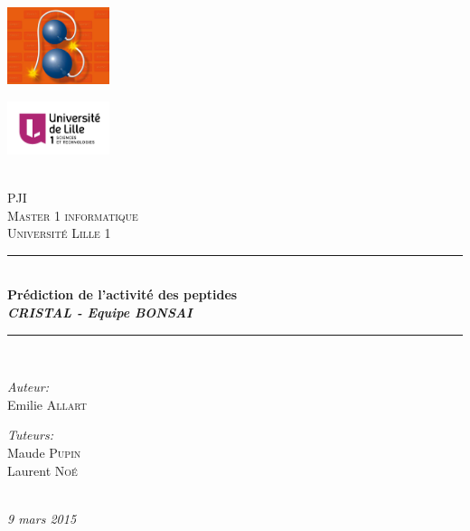 \documentclass[a4paper,10pt]{report}
\date{2014-2015}
\newcommand{\HRule}{\rule{\linewidth}{0.5mm}}
\begin{document}
\begin{titlepage}
 \begin{center}

 \begin{minipage}{0.4\textwidth}
    \begin{flushleft} \large
        \includegraphics[width=3cm]{image/bonsai.jpg}
    \end{flushleft}
  \end{minipage}
  \begin{minipage}{0.4\textwidth}
    \begin{flushright} \large
      \includegraphics[width=3cm]{image/lille1.png}
    \end{flushright}
  \end{minipage} 
  ~\\[3cm]

  \textsc{\LARGE PJI\\ Master 1 informatique}\\[1.5cm]

  \textsc{\Large Université Lille 1}\\[0.5cm]

  \HRule \\[0.5 cm]
  { \huge \bfseries Prédiction de l'activité des peptides\\[0.8cm] \large \emph{CRISTAL - Equipe BONSAI} \\[0.4cm] }
  \HRule \\[1.5 cm]

  \begin{minipage}{0.4\textwidth}
    \begin{flushleft} \large
      \emph{Auteur:}\\
	Emilie \textsc{Allart}
    \end{flushleft}
  \end{minipage}
  \begin{minipage}{0.4\textwidth}
    \begin{flushright} \large
      \emph{Tuteurs:} \\
      Maude \textsc{Pupin} \\
      Laurent \textsc{Noé}
    \end{flushright}
  \end{minipage} 

  \\[3cm]
  {\large \emph{9 mars 2015} }
  \vfill
 \end{center}
\end{titlepage}
\end{document}
